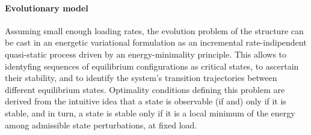 







\paragraph{Evolutionary model}
\label{sec:stability}

Assuming small enough loading rates, 
the evolution problem of the structure can be cast in an energetic variational formulation as an incremental rate-indipendent quasi-static process driven by an energy-minimality principle.
This allows to identyfing sequences of equilibrium configurations as critical states, to ascertain their stability, and to  identify the system's transition trajectories between different equilibrium states.
Optimality conditions defining this problem are derived from the
intuitive idea that a state is observable (if and) only if it is stable, and in turn, a state is stable only if it is a local minimum of the energy among admissible state perturbations, at fixed load. 

